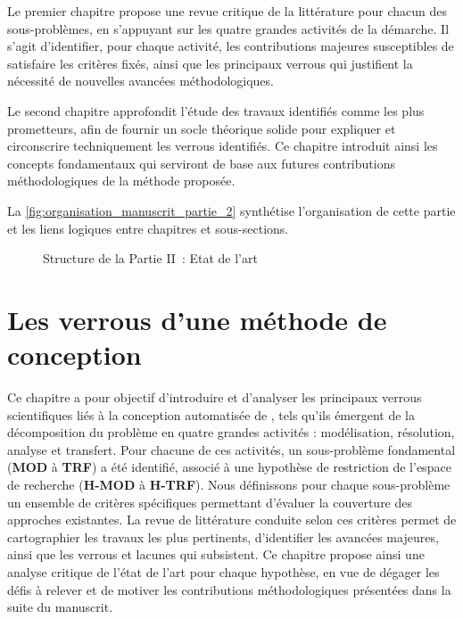 Le premier chapitre propose une revue critique de la littérature pour chacun des sous-problèmes, en s'appuyant sur les quatre grandes activités de la démarche. Il s'agit d'identifier, pour chaque activité, les contributions majeures susceptibles de satisfaire les critères fixés, ainsi que les principaux verrous qui justifient la nécessité de nouvelles avancées méthodologiques.

Le second chapitre approfondit l'étude des travaux identifiés comme les plus prometteurs, afin de fournir un socle théorique solide pour expliquer et circonscrire techniquement les verrous identifiés. Ce chapitre introduit ainsi les concepts fondamentaux qui serviront de base aux futures contributions méthodologiques de la méthode proposée.

La \autoref{fig:organisation_manuscrit_partie_2} synthétise l'organisation de cette partie et les liens logiques entre chapitres et sous-sections.


\begin{figure}[h!]
  \centering
  \resizebox{0.8\textwidth}{!}{%
    
  }
  \caption{Structure de la Partie II~: Etat de l'art}
  \label{fig:organisation_manuscrit_partie_2}
\end{figure}

\clearpage
\thispagestyle{empty}
\null
\newpage


\chapter{Les verrous d'une méthode de conception}
\label{chap:verrous}

\noindent
Ce chapitre a pour objectif d'introduire et d'analyser les principaux verrous scientifiques liés à la conception automatisée de , tels qu'ils émergent de la décomposition du problème en quatre grandes activités : modélisation, résolution, analyse et transfert. Pour chacune de ces activités, un sous-problème fondamental (\textbf{MOD} à \textbf{TRF}) a été identifié, associé à une hypothèse de restriction de l'espace de recherche (\textbf{H-MOD} à \textbf{H-TRF}). Nous définissons pour chaque sous-problème un ensemble de critères spécifiques permettant d'évaluer la couverture des approches existantes. La revue de littérature conduite selon ces critères permet de cartographier les travaux les plus pertinents, d'identifier les avancées majeures, ainsi que les verrous et lacunes qui subsistent. Ce chapitre propose ainsi une analyse critique de l'état de l'art pour chaque hypothèse, en vue de dégager les défis à relever et de motiver les contributions méthodologiques présentées dans la suite du manuscrit.

